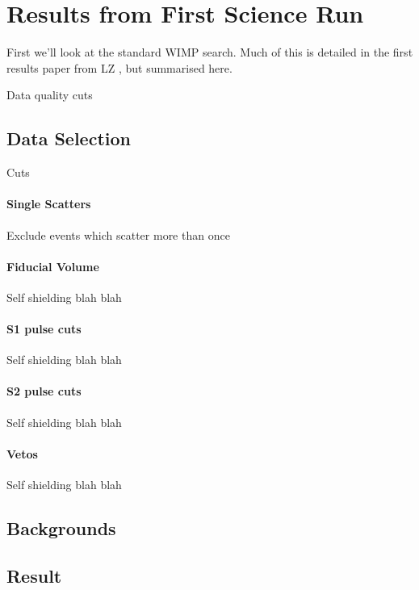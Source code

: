 \section{Results from First Science Run}

\par
First we'll look at the standard WIMP search.
Much of this is detailed in the first results paper from LZ \cite{lz_ws_sr1_ref}, but summarised here.

\par
Data quality cuts

\subsection{Data Selection}
\par
Cuts

\paragraph{Single Scatters}
Exclude events which scatter more than once

\paragraph{Fiducial Volume}
Self shielding blah blah

\paragraph{S1 pulse cuts}
Self shielding blah blah

\paragraph{S2 pulse cuts}
Self shielding blah blah

\paragraph{Vetos}
Self shielding blah blah


\subsection{Backgrounds}




\subsection{Result}

